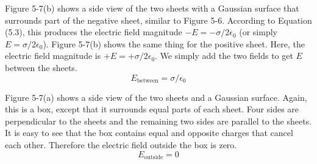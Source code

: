 Figure 5-7(b) shows a side view of the two sheets with a Gaussian surface 
that surrounds part of the negative sheet, similar to Figure 5-6.
According to Equation (5.3), this produces the electric field 
magnitude $-E = -\sigma / 2 \epsilon_0$ (or simply $E = \sigma / 2 \epsilon_0$).
Figure 5-7(b) shows the same thing for the positive sheet.
Here, the electric field magnitude is $+E = +\sigma / 2 \epsilon_0$.
We simply add the two fields to get $E$ between the sheets.
\begin{equation}
  E_{\mathrm{between}} = \sigma / \epsilon_0
\end{equation}

Figure 5-7(a) shows a side view of the two sheets and a Gaussian surface.
Again, this is a box, except that it surrounds equal parts of each sheet.
Four sides are perpendicular to the sheets and the remaining two sides 
are parallel to the sheets.
It is easy to see that the box contains equal and opposite charges that cancel each other.
Therefore the electric field outside the box is zero.
\begin{equation}
  E_{\mathrm{outside}} = 0
\end{equation}

